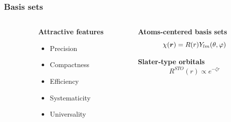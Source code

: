 \begin{frame}
    \frametitle{Basis sets}
    \begin{columns}
    \begin{column}{.10\textwidth}
    \end{column}
    \begin{column}{.30\textwidth}
    \textbf{Attractive features}
    \begin{itemize}
        \item {\color{green} Precision}
        \item {\color{green} Compactness}
        \item {\color{red} Efficiency}
        \item {\color{yellow} Systematicity}
        \item {\color{yellow} Universality}
    \end{itemize}
    \end{column}
    \begin{column}{.60\textwidth}
    \centering
    \textbf{Atoms-centered basis sets}
    \begin{equation}
        \nonumber
        \chi(\boldsymbol r) = R(r)Y_{lm}(\theta,\varphi)
    \end{equation}

    \vspace{5mm}

    \textbf{Slater-type orbitals}
    \begin{equation}
        \nonumber
        R^{STO}(r) \propto e^{-\zeta r}
    \end{equation}
    \end{column}
    \end{columns}

    \vspace{5mm}


\end{frame}
